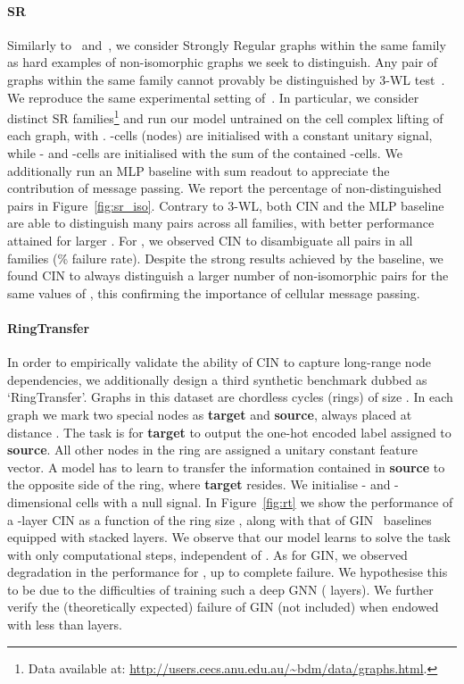 \documentclass{article}
\begin{document}
\paragraph{SR} Similarly to~\citet{bodnar2021weisfeiler} and~\cite{bouritsas2020improving}, we consider Strongly Regular graphs within the same family as hard examples of non-isomorphic graphs we seek to distinguish. Any pair of graphs within the same family cannot provably be distinguished by 3-WL test~\citep{bodnar2021weisfeiler, bouritsas2020improving}. We reproduce the same experimental setting of~\citet{bodnar2021weisfeiler}. In particular, we consider  distinct SR families\footnote{Data available at: \url{http://users.cecs.anu.edu.au/~bdm/data/graphs.html}.} and run our model untrained on the cell complex lifting of each graph, with . -cells (nodes) are initialised with a constant unitary signal, while - and -cells are initialised with the sum of the contained -cells. We additionally run an MLP baseline with sum readout to appreciate the contribution of message passing. We report the percentage of non-distinguished pairs in Figure~\ref{fig:sr_iso}. 
Contrary to 3-WL, both CIN and the MLP baseline are able to distinguish many pairs across all families, with better performance attained for larger . For , we observed CIN to disambiguate all pairs in all families (\% failure rate). Despite the strong results achieved by the baseline, we found CIN to always distinguish a larger number of non-isomorphic pairs for the same values of , this confirming the importance of cellular message passing.


\paragraph{RingTransfer} In order to empirically validate the ability of CIN to capture long-range node dependencies, we additionally design a third synthetic benchmark dubbed as `RingTransfer'. Graphs in this dataset are chordless cycles (rings) of size . In each graph we mark two special nodes as \textbf{target} and \textbf{source}, always placed at distance . The task is for \textbf{target} to output the one-hot encoded label assigned to \textbf{source}. All other nodes in the ring are assigned a unitary constant feature vector. A model has to learn to transfer the information contained in \textbf{source} to the opposite side of the ring, where \textbf{target} resides. We initialise - and -dimensional cells with a null signal. In Figure~\ref{fig:rt} we show the performance of a -layer CIN as a function of the ring size , along with that of GIN~\citep{GIN} baselines equipped with  stacked layers. We observe that our model learns to solve the task with only  computational steps, independent of . As for GIN, we observed degradation in the performance for , up to complete failure. We hypothesise this to be due to the difficulties of training such a deep GNN ( layers). We further verify the (theoretically expected) failure of GIN (not included) when endowed with less than  layers. 
\end{document}
